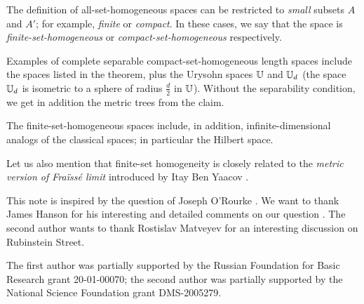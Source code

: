 \documentclass[a4paper,10pt]{article}
\begin{document}
The definition of all-set-homogeneous spaces can be restricted to \emph{small} subsets $A$ and $A'$; for example, \emph{finite} or \emph{compact}.
In these cases, we say that the space is \emph{finite-set-homogeneous} or \emph{compact-set-homogeneous} respectively.

Examples of complete separable compact-set-homogeneous length spaces include the spaces listed in the theorem,
plus the Urysohn spaces $\mathbb{U}$ and $\mathbb{U}_d$ (the space $\mathbb{U}_d$ is isometric to a sphere of radius $\tfrac d2$ in $\mathbb{U}$).
Without the separability condition, we get in addition the metric trees from the claim.

The finite-set-homogeneous spaces include, in addition, infinite-dimensional analogs of the classical spaces;
in particular the Hilbert space.  

Let us also mention that finite-set homogeneity is closely related to the \emph{metric version of Fraïssé limit} introduced by Itay Ben Yaacov \cite{ben-yaacov}. 

This note is inspired by the question of Joseph O'Rourke \cite{rourke}.
We want to thank James Hanson for his interesting and detailed comments on our question \cite{hanson}.
The second author wants to thank Rostislav Matveyev for an interesting discussion on Rubinstein Street. 

The first author was partially supported by the Russian Foundation for Basic Research grant 20-01-00070; the second author was partially supported by the National Science Foundation grant DMS-2005279.

{\sloppy
\printbibliography[heading=bibintoc]
\fussy
}
\end{document}
